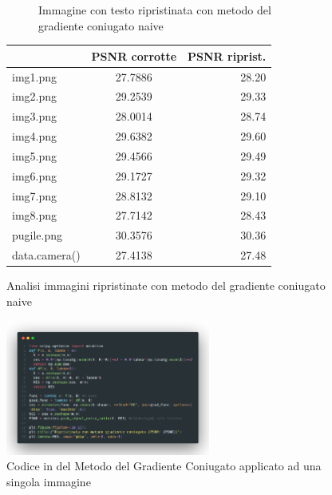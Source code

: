 \begin{figure}[H]
\begin{subfigure}{0.5\textwidth}
    \caption{Immagine con testo ripristinata con metodo del gradiente coniugato naive}
  \end{subfigure}
  \caption{Analisi immagini ripristinate con metodo del gradiente coniugato naive}
  \begin{minipage}{0.6\textwidth}\centering
    \begin{tabular}{|lcr|}
      \hline
      \rowcolor{orange}
      \multicolumn{1}{|c|}{\textbf{Immagine}} & \multicolumn{1}{l|}{\textbf{PSNR corrotte}} & \multicolumn{1}{c|}{\textbf{PSNR riprist.}}  \\ \hline
      img1.png          & 27.7886                      & 28.20                              \\
      img2.png          & 29.2539                      & 29.33                              \\
      img3.png          & 28.0014                      & 28.74                              \\
      img4.png          & 29.6382                      & 29.60                              \\
      img5.png          & 29.4566                      & 29.49                              \\
      img6.png          & 29.1727                      & 29.32                              \\
      img7.png          & 28.8132                      & 29.10                              \\
      img8.png          & 27.7142                      & 28.43                              \\ \hline
      pugile.png        & 30.3576                      & 30.36                              \\
      data.camera()     & 27.4138                      & 27.48                             \\ \hline
      \end{tabular}
  \end{minipage}
\end{figure}

\begin{figure}[H]
  \centering
    \includegraphics[width=0.6\textwidth]{imgCode/metGradCon.png}
    \caption{Codice in  del Metodo del Gradiente Coniugato applicato ad una singola immagine}
    \label{fig:codeMGC}
\end{figure}

